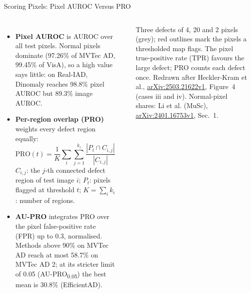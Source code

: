 \begin{frame}{Scoring Pixels: Pixel AUROC Versus PRO}
  \begin{columns}[T,onlytextwidth]
      \begin{itemize}\footnotesize\itemsep0.3em
        \item \textbf{Pixel AUROC} is AUROC over all test pixels. Normal pixels dominate (97.26\% of MVTec AD, 99.45\% of VisA), so a high value says little: on Real-IAD, Dinomaly reaches 98.8\% pixel AUROC but 89.3\% image AUROC.
        \item \textbf{Per-region overlap (PRO)} weights every defect region equally:
        \[ \mathrm{PRO}(t) = \frac{1}{K}\sum_{i}\sum_{j=1}^{k_i}\frac{|P_t \cap C_{i,j}|}{|C_{i,j}|} \]
        $C_{i,j}$: the $j$-th connected defect region of test image $i$; $P_t$: pixels flagged at threshold $t$; $K=\sum_i k_i$: number of regions.
        \item \textbf{AU-PRO} integrates PRO over the pixel false-positive rate (FPR) up to 0.3, normalised. Methods above 90\% on MVTec AD reach at most 58.7\% on MVTec AD 2; at its stricter limit of 0.05 (AU-PRO\textsubscript{0.05}) the best mean is 30.8\% (EfficientAD).
      \end{itemize}
      \centering
      \vspace{0.6em}
      \\[0.4em]
      {\scriptsize Three defects of 4, 20 and 2 pixels (grey); red outlines mark the pixels a thresholded map flags. The pixel true-positive rate (TPR) favours the large defect; PRO counts each defect once. Redrawn after Heckler-Kram et al., \href{https://arxiv.org/abs/2503.21622v1}{arXiv:2503.21622v1}, Figure~4 (cases iii and iv). Normal-pixel shares: Li et al. (MuSc), \href{https://arxiv.org/abs/2401.16753v1}{arXiv:2401.16753v1}, Sec.~1.\par}
  \end{columns}
\end{frame}

